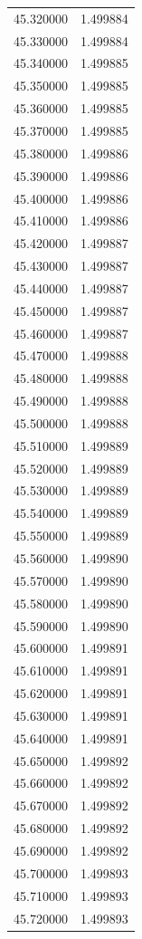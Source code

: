 \begin{tabular}{rr}
45.320000 & 1.499884 \\
45.330000 & 1.499884 \\
45.340000 & 1.499885 \\
45.350000 & 1.499885 \\
45.360000 & 1.499885 \\
45.370000 & 1.499885 \\
45.380000 & 1.499886 \\
45.390000 & 1.499886 \\
45.400000 & 1.499886 \\
45.410000 & 1.499886 \\
45.420000 & 1.499887 \\
45.430000 & 1.499887 \\
45.440000 & 1.499887 \\
45.450000 & 1.499887 \\
45.460000 & 1.499887 \\
45.470000 & 1.499888 \\
45.480000 & 1.499888 \\
45.490000 & 1.499888 \\
45.500000 & 1.499888 \\
45.510000 & 1.499889 \\
45.520000 & 1.499889 \\
45.530000 & 1.499889 \\
45.540000 & 1.499889 \\
45.550000 & 1.499889 \\
45.560000 & 1.499890 \\
45.570000 & 1.499890 \\
45.580000 & 1.499890 \\
45.590000 & 1.499890 \\
45.600000 & 1.499891 \\
45.610000 & 1.499891 \\
45.620000 & 1.499891 \\
45.630000 & 1.499891 \\
45.640000 & 1.499891 \\
45.650000 & 1.499892 \\
45.660000 & 1.499892 \\
45.670000 & 1.499892 \\
45.680000 & 1.499892 \\
45.690000 & 1.499892 \\
45.700000 & 1.499893 \\
45.710000 & 1.499893 \\
45.720000 & 1.499893 \\

\end{tabular}

